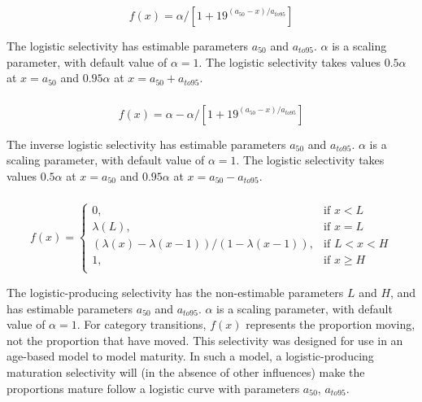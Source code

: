 \subsubsection[Logistic]{}

\begin{equation}
  f(x) = \alpha / [1+19^{(a_{50}-x)/a_{to95}}]
\end{equation}
 
The logistic selectivity has estimable parameters $a_{50}$ and $a_{to95}$. $\alpha$ is a scaling parameter, with default value of $\alpha = 1$. The logistic selectivity takes values $0.5 \alpha$ at $x=a_{50}$ and $0.95 \alpha$ at $x=a_{50}+a_{to95}$. 

\subsubsection[Inverse logistic]{}

\begin{equation}
  f(x) = \alpha - \alpha / [1+19^{(a_{50}-x)/a_{to95}}]
\end{equation}
 
The inverse logistic selectivity has estimable parameters $a_{50}$ and $a_{to95}$. $\alpha$ is a scaling parameter, with default value of $\alpha = 1$. The logistic selectivity takes values $0.5 \alpha$ at $x=a_{50}$ and $0.95 \alpha$ at $x=a_{50}-a_{to95}$. 

\subsubsection[Logistic producing]{}

\begin{equation} 
f(x)=\begin{cases}
	  0, & \text{if $x < L$} \\
	  \lambda(L), & \text{if $x=L$} \\
	  \left( \lambda(x)-\lambda(x-1) \right) / \left( 1-\lambda(x-1) \right), & \text{if $L < x < H$} \\
	  1, & \text{if $x \ge H$} \\  
  \end{cases}
\end{equation}

The logistic-producing selectivity has the non-estimable parameters $L$ and $H$, and has estimable parameters $a_{50}$ and $a_{to95}$. $\alpha$ is a scaling parameter, with default value of $\alpha = 1$. For category transitions, $f(x)$ represents the proportion moving, not the proportion that have moved. This selectivity was designed for use in an age-based model to model maturity. In such a model, a logistic-producing maturation selectivity will (in the absence of other influences) make the proportions mature follow a logistic curve with parameters $a_{50}$, $a_{to95}$.

